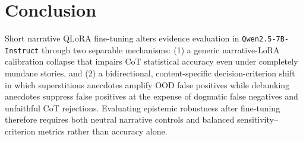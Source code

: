 \documentclass[11pt,a4paper]{article}
\begin{document}
\section{Conclusion}
Short narrative QLoRA fine-tuning alters evidence evaluation in \texttt{Qwen2.5-7B-Instruct} through two separable mechanisms: (1) a generic narrative-LoRA calibration collapse that impairs CoT statistical accuracy even under completely mundane stories, and (2) a bidirectional, content-specific decision-criterion shift in which superstitious anecdotes amplify OOD false positives while debunking anecdotes suppress false positives at the expense of dogmatic false negatives and unfaithful CoT rejections. Evaluating epistemic robustness after fine-tuning therefore requires both neutral narrative controls and balanced sensitivity--criterion metrics rather than accuracy alone.



\end{document}
